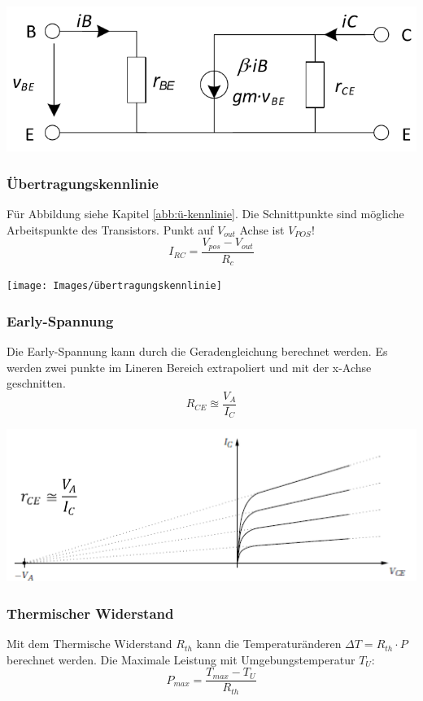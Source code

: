 \begin{center}
	\includegraphics[width=\columnwidth,keepaspectratio=true]{Images/bjt_esb}
\end{center}



\subsubsection{Übertragungskennlinie}
Für Abbildung siehe Kapitel \ref{abb:ü-kennlinie}. Die Schnittpunkte sind mögliche Arbeitspunkte des Transistors. Punkt auf $V_{out}$ Achse ist \underline{$V_{POS}$}!
\[
I_{RC} = \frac{V_{pos} - V_{out}}{R_c}
\]
\begin{center}
	\texttt{[image: Images/übertragungskennlinie]}
\end{center}


\subsubsection{Early-Spannung}
Die Early-Spannung kann durch die Geradengleichung berechnet werden. Es werden zwei punkte im Lineren Bereich extrapoliert und mit der x-Achse geschnitten.
\[
R_{CE} \approxeq \frac{V_A}{I_C}
\]
\begin{center}
	\includegraphics[width=0.7\columnwidth]{Images/early-spannung}
\end{center}

\subsubsection{Thermischer Widerstand}
Mit dem Thermische Widerstand $R_{th}$ kann die Temperaturänderen $\Delta T = R_{th} \cdot P$ berechnet werden. Die Maximale Leistung mit Umgebungstemperatur $T_{U}$: \[P_{max} = \frac{T_{max} - T_U}{R_{th}}\]

